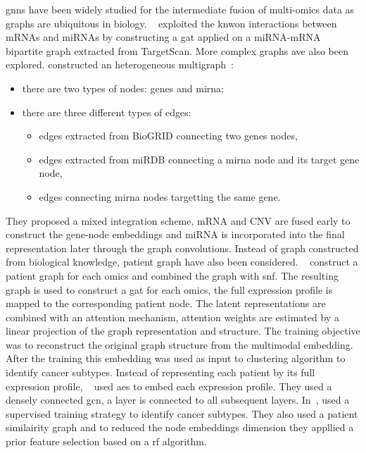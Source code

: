 \documentclass[../main.tex]{subfiles}
\begin{document}
		\Glspl{gnn} have been widely studied for the intermediate fusion of multi-omics data as graphs are ubiquitous in biology.
		\citeauthor{Kaczmarek2021}~\cite{Kaczmarek2021} exploited the knwon interactions between mRNAs and miRNAs by constructing a \gls{gat} applied on a miRNA-mRNA bipartite graph extracted from TargetScan.
		More complex graphs ave also been explored.
		\citeauthor{Li2024} constructed an heterogeneous multigraph~\cite{Li2024}:
		\begin{itemize}[nosep]
			\item there are two types of nodes: genes and \gls{mirna};
			\item there are three different types of edges:
				\begin{itemize}[nosep]
					\item edges extracted from BioGRID\cite{biogrid} connecting two genes nodes,
					\item edges extracted from miRDB\cite{mirdb} connecting a \gls{mirna} node and its target gene node,
					\item edges connecting \gls{mirna} nodes targetting the same gene.
				\end{itemize}
		\end{itemize}
		They proposed a mixed integration scheme, mRNA and CNV are fused early to construct the gene-node embeddings and miRNA is incorporated into the final representation later through the graph convolutions.
		Instead of graph constructed from biological knowledge, patient graph have also been considered.
		\citeauthor{MultiGATAE}~\cite{MultiGATAE} construct a patient graph for each omics and combined the graph with \gls{snf}.
		The resulting graph is used to construct a \gls{gat} for each omics, the full expression profile is mapped to the corresponding patient node.
		The latent representations are combined with an attention mechanism, attention weights are estimated by a linear projection of the graph representation and structure.
		The training objective was to reconstruct the original graph structure from the multimodal embedding.
		After the training this embedding was used as input to clustering algorithm to identify cancer subtypes.
		Instead of representing each patient by its full expression profile, \citeauthor{Zhang2022}~\cite{Zhang2022} used \glspl{ae} to embed each expression profile.
		They used a densely connected \gls{gcn}, a layer is connected to all subsequent layers.
		In~\cite{Kesimoglu2022}, \citeauthor{Kesimoglu2022} used a supervised training strategy to identify cancer subtypes.
		They also used a patient similairity graph and to reduced the node embeddings dimension they appllied a prior feature selection based on a \gls{rf} algorithm.
\end{document}
